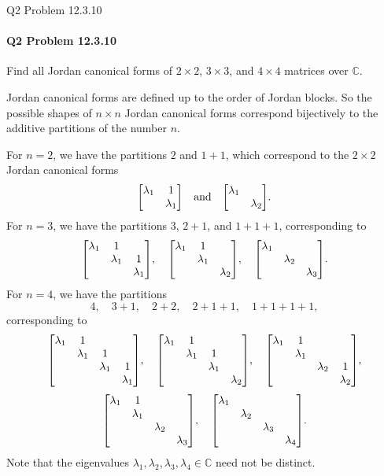 \documentclass[12pt]{article}
\newenvironment{fullbox}{\begin{lrbox}{\savefullbox}\begin{minipage}{\dimexpr\textwidth-2\fboxsep\relax}}{\end{minipage}\end{lrbox}\begin{center}\framebox[\textwidth]{\usebox{\savefullbox}}\end{center}}
\newenvironment{pbox}[1][]{\begin{fullbox}\ifx#1\empty\else\paragraph{#1}\fi}{\end{fullbox}}
\theoremstyle{definition}
\newcommand{\isp}[1]{\quad\text{#1}\quad}
\newcommand{\C}{\mathbb{C}}
\begin{document}
\newpage
\begin{pbox}[Q2 Problem 12.3.10]
    Find all Jordan canonical forms of $2 \times 2$, $3 \times 3$, and $4 \times 4$ matrices over $\C$.
\end{pbox}

Jordan canonical forms are defined up to the order of Jordan blocks. So the possible shapes of $n \times n$ Jordan canonical forms correspond bijectively to the additive partitions of the number $n$. 

For $n = 2$, we have the partitions $2$ and $1 + 1$, which correspond to the $2 \times 2$ Jordan canonical forms
\[
    \mqty[\lambda_1 & 1 \\ & \lambda_1]
    \isp{and}
    \mqty[\lambda_1 \\ & \lambda_2].
\]
For $n = 3$, we have the partitions $3$, $2 + 1$, and $1 + 1 + 1$, corresponding to
\[
    \mqty[\lambda_1 & 1 \\ & \lambda_1 & 1 \\ & & \lambda_1],
    \quad
    \mqty[\lambda_1 & 1 \\ & \lambda_1 \\ & & \lambda_2],
    \quad
    \mqty[\lambda_1 \\ & \lambda_2 \\ & & \lambda_3].
\]
For $n = 4$, we have the partitions
\[
    4, \quad 3 + 1, \quad 2 + 2, \quad 2 + 1 + 1, \quad 1 + 1 + 1 + 1,
\]
corresponding to
\[
    \mqty[\lambda_1 & 1 \\ & \lambda_1 & 1 \\ & & \lambda_1 & 1 \\ & & & \lambda_1],
    \quad
    \mqty[\lambda_1 & 1 \\ & \lambda_1 & 1 \\ & & \lambda_1 \\ & & & \lambda_2],
    \quad
    \mqty[\lambda_1 & 1 \\ & \lambda_1 \\ & & \lambda_2 & 1 \\ & & & \lambda_2],
\]
\[
    \mqty[\lambda_1 & 1 \\ & \lambda_1 \\ & & \lambda_2 \\ & & & \lambda_3],
    \quad
    \mqty[\lambda_1 \\ & \lambda_2 \\ & & \lambda_3 \\ & & & \lambda_4].
\]
Note that the eigenvalues $\lambda_1, \lambda_2, \lambda_3, \lambda_4 \in \C$ need not be distinct.
\end{document}
